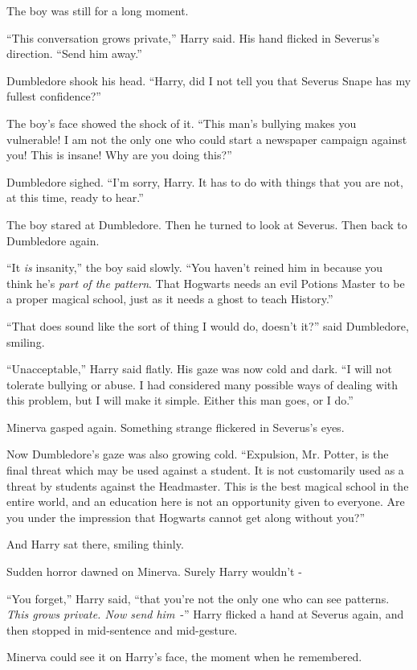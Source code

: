 The boy was still for a long moment.

``This conversation grows private,'' Harry said. His hand flicked in Severus's direction. ``Send him away.''

Dumbledore shook his head. ``Harry, did I not tell you that Severus Snape has my fullest confidence?''

The boy's face showed the shock of it. ``This man's bullying makes you vulnerable! I am not the only one who could start a newspaper campaign against you! This is insane! Why are you doing this?''

Dumbledore sighed. ``I'm sorry, Harry. It has to do with things that you are not, at this time, ready to hear.''

The boy stared at Dumbledore. Then he turned to look at Severus. Then back to Dumbledore again.

``It \emph{is} insanity,'' the boy said slowly. ``You haven't reined him in because you think he's \emph{part of the pattern}. That Hogwarts needs an evil Potions Master to be a proper magical school, just as it needs a ghost to teach History.''

``That does sound like the sort of thing I would do, doesn't it?'' said Dumbledore, smiling.

``Unacceptable,'' Harry said flatly. His gaze was now cold and dark. ``I will not tolerate bullying or abuse. I had considered many possible ways of dealing with this problem, but I will make it simple. Either this man goes, or I do.''

Minerva gasped again. Something strange flickered in Severus's eyes.

Now Dumbledore's gaze was also growing cold. ``Expulsion, Mr. Potter, is the final threat which may be used against a student. It is not customarily used as a threat by students against the Headmaster. This is the best magical school in the entire world, and an education here is not an opportunity given to everyone. Are you under the impression that Hogwarts cannot get along without you?''

And Harry sat there, smiling thinly.

Sudden horror dawned on Minerva. Surely Harry wouldn't -

``You forget,'' Harry said, ``that you're not the only one who can see patterns. \emph{This grows private. Now send him}~-'' Harry flicked a hand at Severus again, and then stopped in mid-sentence and mid-gesture.

Minerva could see it on Harry's face, the moment when he remembered.

